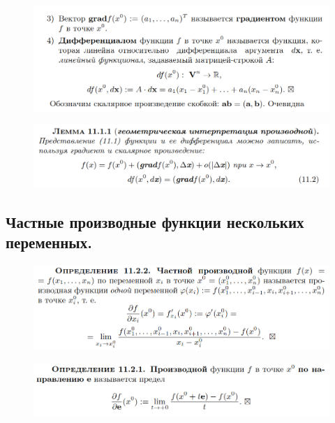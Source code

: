 \documentclass{article}
\begin{document}
\begin{figure}[h!]
    \centering
    \includegraphics[width=\textwidth]{34.png}
    \vspace{-1cm}
\end{figure}
\begin{figure}[h!]
    \centering
    \includegraphics[width=\textwidth]{50.png}
    \vspace{-1cm}
\end{figure}

\newpage
\subsection{Частные производные функции нескольких переменных.}
\begin{figure}[h!]
    \centering
    \includegraphics[width=\textwidth]{40.png}
    \vspace{-1.5cm}
\end{figure}

\begin{figure}[h!]
    \centering
    \includegraphics[width=\textwidth]{35.png}
    \vspace{-1cm}
\end{figure}
\end{document}

